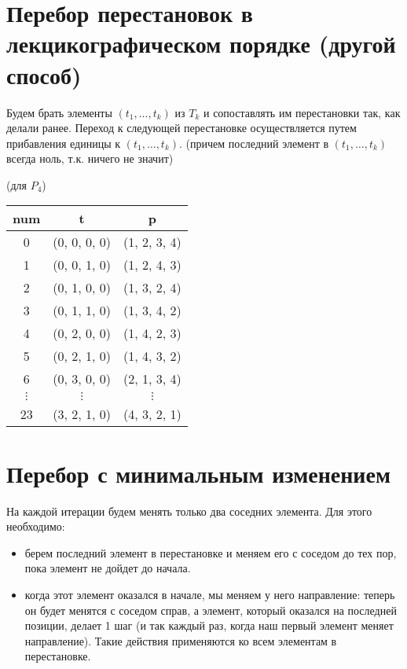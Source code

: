 




\section{Перебор перестановок в лекцикографическом порядке (другой способ)}


\begin{algoritm}
    Будем брать элементы $(t_1, \ldots, t_k)$ из $T_k$ и сопоставлять им перестановки так, как делали ранее. Переход к следующей перестановке осуществляется путем прибавления единицы к $(t_1, \ldots, t_k)$. (причем последний элемент в $(t_1, \ldots, t_k)$ всегда ноль, т.к. ничего не значит)
\end{algoritm}

\begin{eg} (для $P_4$)
    \begin{tabular}{|c|c|c|}
        \hline
        num & t & p\\
        \hline
        0 & (0, 0, 0, 0) & (1, 2, 3, 4)\\
        1 & (0, 0, 1, 0) & (1, 2, 4, 3)\\
        2 & (0, 1, 0, 0) & (1, 3, 2, 4)\\
        3 & (0, 1, 1, 0) & (1, 3, 4, 2)\\
        4 & (0, 2, 0, 0) & (1, 4, 2, 3)\\
        5 & (0, 2, 1, 0) & (1, 4, 3, 2)\\
        6 & (0, 3, 0, 0) & (2, 1, 3, 4)\\
        $\vdots$ & $\vdots$ & $\vdots$\\
        23 & (3, 2, 1, 0) & (4, 3, 2, 1)\\
        \hline
    \end{tabular}
\end{eg}

\section{Перебор с минимальным изменением}
На каждой итерации будем менять только два соседних элемента. Для этого необходимо:
\begin{itemize}
    \item берем последний элемент в перестановке и меняем его с соседом до тех пор, пока элемент не дойдет до начала.
    \item когда этот элемент оказался в начале, мы меняем у него направление: теперь он будет менятся с соседом справ, а элемент, который оказался на последней позиции, делает 1 шаг (и так каждый раз, когда наш первый элемент меняет направление). Такие действия применяются ко всем элементам в перестановке.
\end{itemize}

